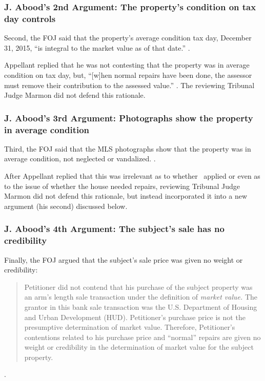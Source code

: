 \documentclass[12pt,\documentclassflag]{michiganCourtOfAppealsBrief}
\begin{document}
\subsubsection{J. Abood's 2nd Argument: The property's condition on tax day controls}

Second, the FOJ said that the property's average condition tax day, December 31, 2015, ``is integral to the market value as of that date.'' .

Appellant replied that he was not contesting that the property was in average condition on tax day, but, ``[w]hen normal repairs have been done, the assessor must remove their contribution to the assessed value.'' .
The reviewing Tribunal Judge Marmon did not defend this rationale.

\subsubsection{J. Abood's 3rd Argument: Photographs show the property in average condition}

Third, the FOJ said that the MLS photographs show that the property was in average condition, not neglected or vandalized. .

After Appellant replied that this was irrelevant as to whether \mathieuGast\ applied or even as to the issue of whether the house needed repairs, reviewing Tribunal Judge Marmon did not defend this rationale, but instead incorporated it into a new argument (his second) discussed below.

\subsubsection{J. Abood's 4th Argument: The subject's sale has no credibility}

Finally, the FOJ argued that the subject's sale price was given no weight or credibility:

\begin{quote}
  Petitioner did not contend that his purchase of the subject property was an arm's length sale transaction under the definition of \emph{market value.} The grantor in this bank sale transaction was the U.S. Department of Housing and Urban Development (HUD). Petitioner's purchase price is not the presumptive determination of market value. Therefore, Petitioner's contentions related to his purchase price and ``normal'' repairs are given no weight or credibility in the determination of market value for the subject property.
\end{quote}
.
\end{document}
